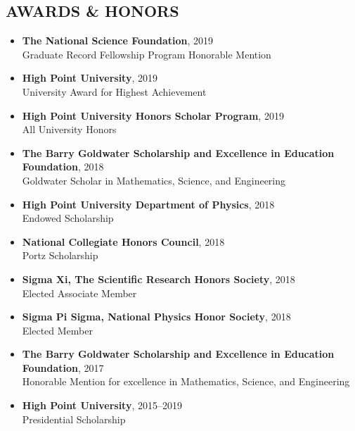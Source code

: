 \documentclass[margin, 10pt]{res} %
\begin{document}
\begin{resume}
\section{AWARDS \& HONORS}
\begin{itemize}
    \item \textbf{{\scriptsize The National Science Foundation}}, {\small 2019}\\Graduate Record Fellowship Program Honorable Mention
    \item \textbf{{\scriptsize High Point University}},
    {\small 2019}\\University Award for Highest Achievement
    \item \textbf{{\scriptsize High Point University Honors Scholar Program}},
    {\small 2019}\\All University Honors
	\item \textbf{{\scriptsize The Barry Goldwater Scholarship and Excellence in Education Foundation}}, {\small 2018}\\Goldwater Scholar in Mathematics, Science, and Engineering 
    \item \textbf{{\scriptsize High Point University Department of Physics}}, {\small 2018}\\Endowed Scholarship
    \item {\scriptsize \textbf{National Collegiate Honors Council}}, {\small 2018}\\Portz Scholarship
    \item \textbf{{\scriptsize Sigma Xi, The Scientific Research Honors Society}}, {\small 2018}\\Elected Associate Member
     \item \textbf{{\scriptsize Sigma Pi Sigma, National Physics Honor Society}}, {\small 2018}\\Elected Member
    \item \textbf{{\scriptsize The Barry Goldwater Scholarship and Excellence in Education Foundation}}, {\small 2017}\\Honorable Mention for excellence in Mathematics, Science, and Engineering 
	\item \textbf{{\scriptsize High Point University}}, {\small 2015--2019}\\Presidential Scholarship
\end{itemize}


\end{resume}
\end{document}
